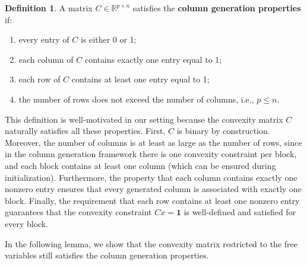 \documentclass{book}
\theoremstyle{definition}
\newtheorem{definition}[theorem]{Definition}
\numberwithin{algorithm_}{chapter}
\begin{document}
\begin{definition} \label{def:column-generation-properties}
A matrix \( C \in \mathbb{R}^{p \times n} \) satisfies the \textbf{column generation properties} if:
\begin{enumerate}
    \item every entry of \( C \) is either 0 or 1; \label{def:cg1}
    \item each column of \( C \) contains exactly one entry equal to 1; \label{def:cg2}
    \item each row of \( C \) contains at least one entry equal to 1; \label{def:cg3}
    \item the number of rows does not exceed the number of columns, i.e., $p \le n$. \label{def:cg4}
\end{enumerate}
\end{definition}

\medskip

This definition is well-motivated in our setting because the convexity matrix \(C\) naturally satisfies all these properties. First, \(C\) is binary by construction. Moreover, the number of columns is at least as large as the number of rows, since in the column generation framework there is one convexity constraint per block, and each block contains at least one column (which can be ensured during initialization). Furthermore, the property that each column contains exactly one nonzero entry ensures that every generated column is associated with exactly one block. Finally, the requirement that each row contains at least one nonzero entry guarantees that the convexity constraint \(Cx = \mathbf{1}\) is well-defined and satisfied for every block.

\bigskip

In the following lemma, we show that the convexity matrix restricted to the free variables still satisfies the column generation properties.
\end{document}
